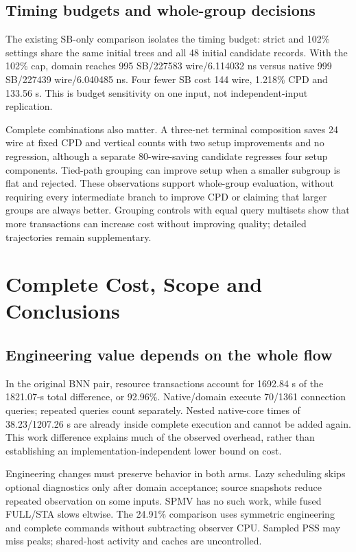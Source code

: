 \documentclass[conference,10pt]{IEEEtran}
\begin{document}
\subsection{Timing budgets and whole-group decisions}
The existing SB-only comparison isolates the timing budget: strict and 102\% settings share the same initial trees and all 48 initial candidate records. With the 102\% cap, domain reaches 995 SB/227583 wire/6.114032 ns versus native 999 SB/227439 wire/6.040485 ns. Four fewer SB cost 144 wire, 1.218\% CPD and 133.56 s. This is budget sensitivity on one input, not independent-input replication.

Complete combinations also matter. A three-net terminal composition saves 24 wire at fixed CPD and vertical counts with two setup improvements and no regression, although a separate 80-wire-saving candidate regresses four setup components. Tied-path grouping can improve setup when a smaller subgroup is flat and rejected. These observations support whole-group evaluation, without requiring every intermediate branch to improve CPD or claiming that larger groups are always better. Grouping controls with equal query multisets show that more transactions can increase cost without improving quality; detailed trajectories remain supplementary.

\section{Complete Cost, Scope and Conclusions}
\subsection{Engineering value depends on the whole flow}
In the original BNN pair, resource transactions account for 1692.84 s of the 1821.07-s total difference, or 92.96\%. Native/domain execute 70/1361 connection queries; repeated queries count separately. Nested native-core times of 38.23/1207.26 s are already inside complete execution and cannot be added again. This work difference explains much of the observed overhead, rather than establishing an implementation-independent lower bound on cost.

Engineering changes must preserve behavior in both arms. Lazy scheduling skips optional diagnostics only after domain acceptance; source snapshots reduce repeated observation on some inputs. SPMV has no such work, while fused FULL/STA slows eltwise. The 24.91\% comparison uses symmetric engineering and complete commands without subtracting observer CPU. Sampled PSS may miss peaks; shared-host activity and caches are uncontrolled.
\end{document}
